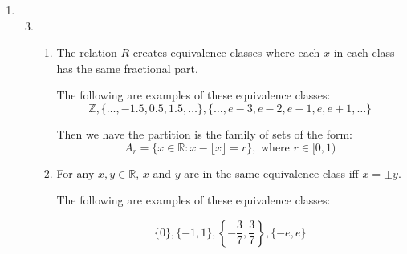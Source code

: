 \documentclass[12pt,letterpaper]{article}
\begin{document}
\begin{enumerate}
\begin{enumerate}
\begin{proof}
            Choose $x = 1, y = 2, z = 4$.
            Then $x, y, z, w \in \mathbb{N}$ and $1 + 2 = 3 = 3(1), 2 + 4 = 6 = 3(2)$,
            so $x S y$ and $y S z$.

            Now, if $S$ were transitive, we'd have $x S z$.
            However, $1 + 4 = 5$ and 3 does not divide 5.

            So $S$ is not transitive.

            Thus, $S$ is not an equivalence relation.
          \end{proof}
      \end{enumerate}
    \item
      \begin{enumerate}
        \setcounter{enumii}{2}
        \item
          \begin{enumerate}
            \item
              The relation $R$ creates equivalence classes where each $x$ in each class has the same fractional part.

              The following are examples of these equivalence classes:
              \[
                \mathbb{Z}, \{\dots, -1.5, 0.5, 1.5, \dots\}, \{\dots, e - 3, e - 2, e - 1, e, e + 1, \dots\}
              \]

              Then we have the partition is the family of sets of the form:
              \[
                A_r = \{x \in \mathbb{R} : x - \lfloor x \rfloor = r\}, \text{ where } r \in [0, 1)
              \]
            \setcounter{enumiii}{3}
            \item
              For any $x, y \in \mathbb{R}$, $x$ and $y$ are in the same equivalence class iff $x = \pm y$.

              The following are examples of these equivalence classes:

              \[
                \{0\}, \{-1, 1\}, \left\{-\frac{3}{7}, \frac{3}{7}\right\}, \{-e, e\}
              \]


\end{enumerate}
\end{enumerate}
\end{enumerate}
\end{document}
